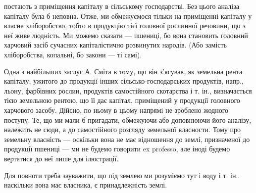постають з приміщення капіталу в сільському господарстві. Без цього аналіза
капіталу була б неповна. Отже, ми обмежуємося тільки на приміщенні капіталу
у власне хліборобство, тобто в продукцію тієї головної рослинної речовини, що
з неї живе людність. Ми можемо сказати — пшениці, бо вона становить головний
харчовий засіб сучасних капіталістично розвинутих народів. (Або замість
хліборобства, копальні, бо закони — ті самі).

Одна з найбільших заслуг А. Сміта в тому, що він з’ясував, як земельна
рента капіталу, ужитого до продукції інших сільсько-господарських продуктів,
напр., льону, фарбівних рослин, продуктів самостійного скотарства і т. ін., визначається
тією земельною рентою, що її дає капітал, приміщений у продукції
головного харчового засобу. Дійсно, по ньому в цьому напрямі не зроблено жодного
поступу. Те, що ми мали б пригадати, обмежуючи або доповнюючи його
аналізу, належить не сюди, а до самостійного розгляду земельної власности.
Тому про земельну власність — оскільки вона не має відношення до землі, призначеної
до продукції пшениці — ми не будемо говорити ex professo, але іноді
будемо вертатися до неї лише для ілюстрації.

Для повноти треба зауважити, що під землею ми розуміємо тут і воду і т. ін..
наскільки вона має власника, є принадлежність землі.


